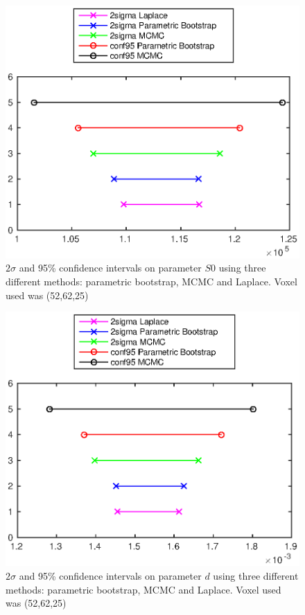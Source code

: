 \documentclass[11pt,a4paper,oneside]{report}
\begin{document}
\begin{figure}[H]
      \centering
    \includegraphics[scale=1]{figures/q2/q123-p1.eps}
    \caption{$2\sigma$ and 95\% confidence intervals on parameter $S0$ using three different methods: parametric bootstrap, MCMC and Laplace. Voxel used was (52,62,25) }
    \label{q123-p1}
\end{figure}

\begin{figure}[H]
      \centering
    \includegraphics[scale=1]{figures/q2/q123-p2.eps}
    \caption{$2\sigma$ and 95\% confidence intervals on parameter $d$ using three different methods: parametric bootstrap, MCMC and Laplace. Voxel used was (52,62,25) }
    \label{q123-p2}
\end{figure}
\end{document}
